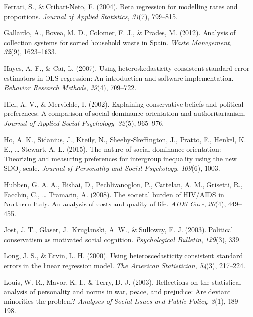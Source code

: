 \documentclass[english,man]{apa6}
\newcounter{author}
\theoremstyle{definition}
\theoremstyle{definition}
\theoremstyle{remark}
\begin{document}
\hypertarget{ref-ferrari2004beta}{}
Ferrari, S., \& Cribari-Neto, F. (2004). Beta regression for modelling
rates and proportions. \emph{Journal of Applied Statistics},
\emph{31}(7), 799--815.

\hypertarget{ref-gallardo2012analysis}{}
Gallardo, A., Bovea, M. D., Colomer, F. J., \& Prades, M. (2012).
Analysis of collection systems for sorted household waste in Spain.
\emph{Waste Management}, \emph{32}(9), 1623--1633.

\hypertarget{ref-hayes2007using}{}
Hayes, A. F., \& Cai, L. (2007). Using heteroskedasticity-consistent
standard error estimators in OLS regression: An introduction and
software implementation. \emph{Behavior Research Methods}, \emph{39}(4),
709--722.

\hypertarget{ref-hiel2002explaining}{}
Hiel, A. V., \& Mervielde, I. (2002). Explaining conservative beliefs
and political preferences: A comparison of social dominance orientation
and authoritarianism. \emph{Journal of Applied Social Psychology},
\emph{32}(5), 965--976.

\hypertarget{ref-ho2015nature}{}
Ho, A. K., Sidanius, J., Kteily, N., Sheehy-Skeffington, J., Pratto, F.,
Henkel, K. E., \ldots{} Stewart, A. L. (2015). The nature of social
dominance orientation: Theorizing and measuring preferences for
intergroup inequality using the new SDO\(_7\) scale. \emph{Journal of
Personality and Social Psychology}, \emph{109}(6), 1003.

\hypertarget{ref-hubben2008societal}{}
Hubben, G. A. A., Bishai, D., Pechlivanoglou, P., Cattelan, A. M.,
Grisetti, R., Facchin, C., \ldots{} Tramarin, A. (2008). The societal
burden of HIV/AIDS in Northern Italy: An analysis of costs and quality
of life. \emph{AIDS Care}, \emph{20}(4), 449--455.

\hypertarget{ref-jost2003political}{}
Jost, J. T., Glaser, J., Kruglanski, A. W., \& Sulloway, F. J. (2003).
Political conservatism as motivated social cognition.
\emph{Psychological Bulletin}, \emph{129}(3), 339.

\hypertarget{ref-long2000using}{}
Long, J. S., \& Ervin, L. H. (2000). Using heteroscedasticity consistent
standard errors in the linear regression model. \emph{The American
Statistician}, \emph{54}(3), 217--224.

\hypertarget{ref-louis2003reflections}{}
Louis, W. R., Mavor, K. I., \& Terry, D. J. (2003). Reflections on the
statistical analysis of personality and norms in war, peace, and
prejudice: Are deviant minorities the problem? \emph{Analyses of Social
Issues and Public Policy}, \emph{3}(1), 189--198.
\end{document}
